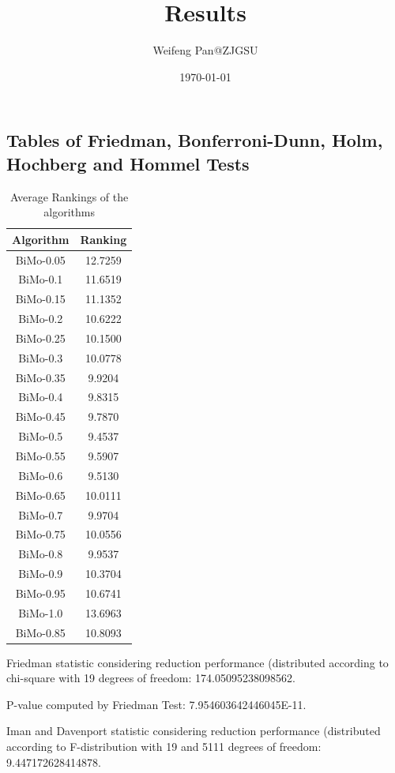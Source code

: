 \documentclass[a4paper,10pt]{article}
\title{Results}
\author{Weifeng Pan@ZJGSU}
\date{\today}
\begin{document}
\begin{landscape}
\oddsidemargin 0in \topmargin 0in\maketitle
\section{Tables of Friedman, Bonferroni-Dunn, Holm, Hochberg and Hommel Tests}
\begin{table}[!htp]
\centering
\caption{Average Rankings of the algorithms
}\begin{tabular}{c|c}
Algorithm&Ranking\\
\hline
BiMo-0.05&12.7259\\
BiMo-0.1&11.6519\\
BiMo-0.15&11.1352\\
BiMo-0.2&10.6222\\
BiMo-0.25&10.1500\\
BiMo-0.3&10.0778\\
BiMo-0.35&9.9204\\
BiMo-0.4&9.8315\\
BiMo-0.45&9.7870\\
BiMo-0.5&9.4537\\
BiMo-0.55&9.5907\\
BiMo-0.6&9.5130\\
BiMo-0.65&10.0111\\
BiMo-0.7&9.9704\\
BiMo-0.75&10.0556\\
BiMo-0.8&9.9537\\
BiMo-0.9&10.3704\\
BiMo-0.95&10.6741\\
BiMo-1.0&13.6963\\
BiMo-0.85&10.8093\\
\end{tabular}
\end{table}


Friedman statistic considering reduction performance (distributed according to chi-square with 19 degrees of freedom: 174.05095238098562.


P-value computed by Friedman Test: 7.954603642446045E-11.\newline

Iman and Davenport statistic considering reduction performance (distributed according to F-distribution with 19 and 5111 degrees of freedom: 9.447172628414878.



\end{landscape}
\end{document}
